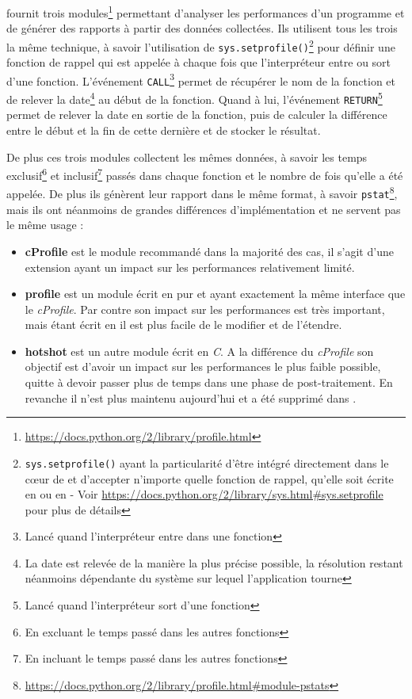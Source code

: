 \Python fournit trois modules\footnote{\url{https://docs.python.org/2/library/profile.html}} permettant d'analyser les performances d'un programme et de générer des rapports à partir des données collectées. Ils utilisent tous les trois la même technique, à savoir l'utilisation de \verb|sys.setprofile()|\footnote{\verb?sys.setprofile()? ayant la particularité d'être intégré directement dans le cœur de \Python et d'accepter n'importe quelle fonction de rappel, qu'elle soit écrite en \C ou en \Python - Voir \url{https://docs.python.org/2/library/sys.html#sys.setprofile} pour plus de détails} pour définir une fonction de rappel qui est appelée à chaque fois que l'interpréteur entre ou sort d'une fonction. 
L'événement \verb|CALL|\footnote{Lancé quand l'interpréteur entre dans une fonction} permet de récupérer le nom de la fonction et de relever la date\footnote{La date est relevée de la manière la plus précise possible, la résolution restant néanmoins dépendante du système sur lequel l'application tourne} au début de la fonction. Quand à lui, l'événement \verb|RETURN|\footnote{Lancé quand l'interpréteur sort d'une fonction} permet de relever la date en sortie de la fonction, puis de calculer la différence entre le début et la fin de cette dernière et de stocker le résultat.

De plus ces trois modules collectent les mêmes données, à savoir les temps exclusif\footnote{En excluant le temps passé dans les autres fonctions} et inclusif\footnote{En incluant le temps passé dans les autres fonctions} passés dans chaque fonction et le nombre de fois qu'elle a été appelée. De plus ils génèrent leur rapport dans le même format, à savoir \verb|pstat|\footnote{\url{https://docs.python.org/2/library/profile.html#module-pstats}}, mais ils ont néanmoins de grandes différences d'implémentation et ne servent pas le même usage : 

\begin{itemize}
\item \textbf{cProfile} est le module recommandé dans la majorité des cas, il s'agit d'une extension \C ayant un impact sur les performances relativement limité.
\item \textbf{profile} est un module écrit en pur \Python et ayant exactement la même interface que le \emph{cProfile}. Par contre son impact sur les performances est très important, mais étant écrit en \Python il est plus facile de le modifier et de l'étendre.
\item \textbf{hotshot} est un autre module écrit en \emph{C}. A la différence du \emph{cProfile} son objectif est d'avoir un impact sur les performances le plus faible possible, quitte à devoir passer plus de temps dans une phase de post-traitement. En revanche il n'est plus maintenu aujourd'hui et a été supprimé dans .
\end{itemize}